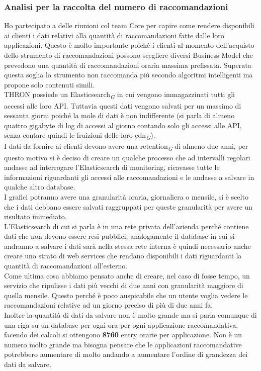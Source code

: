 \documentclass[a4paper, 12pt, twoside, openright]{book}
\newcommand{\gloss}[1]{#1\textsubscript{\textit{\tiny{G}}}}
\begin{document}
\subsubsection{Analisi per la raccolta del numero di raccomandazioni}
Ho partecipato a delle riunioni col team Core per capire come rendere disponibili ai clienti i dati relativi alla quantità di raccomandazioni fatte dalle loro applicazioni. Questo è molto importante poiché i clienti al momento dell'acquisto dello strumento di raccomandazioni possono scegliere diversi Business Model che prevedono una quantità di raccomandazioni oraria massima prefissata. Superata questa soglia lo strumento non raccomanda più secondo algoritmi intelligenti ma propone solo contenuti simili.\\
THRON possiede un \gloss{Elasticsearch} in cui vengono immagazzinati tutti gli accessi alle loro API. Tuttavia questi dati vengono salvati per un massimo di sessanta giorni poiché la mole di dati è non indifferente (si parla di almeno quattro gigabyte di log di accessi al giorno contando solo gli accessi alle API, senza contare quindi le fruizioni delle loro \gloss{cdn}).\\
I dati da fornire ai clienti devono avere una \gloss{retention} di almeno due anni, per questo motivo si è deciso di creare un qualche processo che ad intervalli regolari andasse ad interrogare l'Elasticsearch di monitoring, ricavasse tutte le informazioni riguardanti gli accessi alle raccomandazioni e le andasse a salvare in qualche altro database.\\
I grafici potranno avere una granularità oraria, giornaliera o mensile, si è scelto che i dati debbano essere salvati raggruppati per queste granularità per avere un risultato immediato.\\
L'Elasticsearch di cui si parla è in una rete privata dell'azienda perché contiene dati che non devono essere resi pubblici, analogamente il database in cui si andranno a salvare i dati sarà nella stessa rete interna è quindi necessario anche creare uno strato di web services che rendano disponibili i dati riguardanti la quantità di raccomandazioni all'esterno.\\
Come ultima cosa abbiamo pensato anche di creare, nel caso di fosse tempo, un servizio che ripulisse i dati più vecchi di due anni con granularità maggiore di quella mensile. Questo perché è poco auspicabile che un utente voglia vedere le raccomandazioni relative ad un giorno preciso di più di due anni fa.\\
Inoltre la quantità di dati da salvare non è molto grande ma si parla comunque di una riga su un database per ogni ora per ogni applicazione raccomandativa, facendo dei calcoli si ottengono \textbf{8760} entry orarie per applicazione. Non è un numero molto grande ma bisogna pensare che le applicazioni raccomandative potrebbero aumentare di molto andando a aumentare l'ordine di grandezza dei dati da salvare.\\
\end{document}
